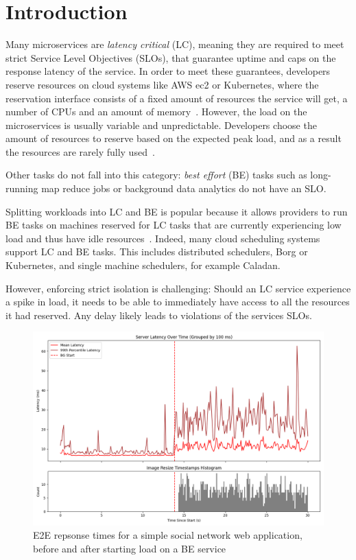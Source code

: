 \section{Introduction}
\label{s:intro}

Many microservices are \textit{latency critical} (LC), meaning they are required
to meet strict Service Level Objectives (SLOs), that guarantee uptime and caps
on the response latency of the service. In order to meet these guarantees,
developers reserve resources on cloud systems like AWS ec2 or Kubernetes, where
the reservation interface consists of a fixed amount of resources the service
will get, \ie{} a number of CPUs and an amount of
memory~\cite{aws-ec2-resources, kubernetes-resources}. However, the load on the
microservices is usually variable and unpredictable. Developers choose the
amount of resources to reserve based on the expected peak load, and as a result
the resources are rarely fully used~\cite{borg, nu, overprovision}.

Other tasks do not fall into this category: \textit{best effort} (BE) tasks such
as long-running map reduce jobs or background data analytics do not have an SLO.

Splitting workloads into LC and BE is popular because it allows providers to run
BE tasks on machines reserved for LC tasks that are currently experiencing low
load and thus have idle resources~\cite{perfiso}. Indeed, many cloud scheduling
systems support LC and BE tasks. This includes distributed schedulers, \eg{}
Borg\cite{borg} or Kubernetes\cite{kubernetes-resources}, and single machine
schedulers, for example Caladan\cite{caladan}.

However, enforcing strict isolation is challenging: Should an LC service
experience a spike in load, it needs to be able to immediately have access to
all the resources it had reserved. Any delay likely leads to violations of the
services SLOs.

\begin{figure}[t]
    \centering
    \includegraphics[width=\columnwidth]{graphs/kubernetes-unedited.png}
    \caption{E2E repsonse times for a simple social network web application,
    before and after starting load on a BE
    service}\label{fig:kubernetes-unedited}
\end{figure}

